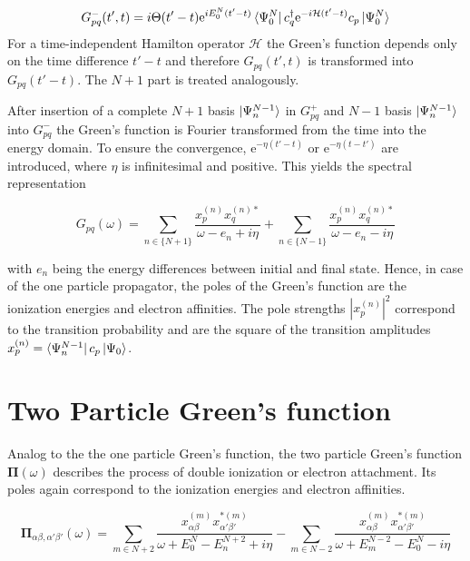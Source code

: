 \begin{equation}\label{g-hsb}
G_{pq}^-(t',t) = i\Theta(t'-t) \mathrm{e}^{iE_0^N(t'-t)}\bra{\Psi_0^N}c_q^\dagger\mathrm{e}^{-i\mathcal{H}(t'-t)}c_p\ket{\Psi_0^N}
\end{equation}
For a time-independent Hamilton operator $\mathcal{H}$ the Green's function
depends only on the time difference $t'-t$ and therefore $G_{pq}(t',t)$ is
transformed into $G_{pq}(t'-t)$. The $N+1$ part is treated analogously.

After insertion of a complete $N+1$ basis $\ket{\Psi_n^{N-1}}$ in
$G_{pq}^+$ and $N-1$ basis $\ket{\Psi_n^{N-1}}$
into $G_{pq}^-$ the Green's function is Fourier transformed from the time
into the energy domain. To ensure the convergence, 
$\mathrm{e}^{-\eta(t'-t)}$ or $\mathrm{e}^{-\eta(t-t')}$ are introduced,
where $\eta$ is infinitesimal and positive.
This yields the spectral representation

\begin{equation}\label{spektraldst}
G_{pq}(\omega) = \sum\limits_{n\in\{N+1\}}\frac{x_p^{(n)}x_q^{(n)*}}{\omega-e_n +i\eta} + \sum\limits_{n\in\{N-1\}}\frac{x_p^{(n)}x_q^{(n)*}}{\omega-e_n -i\eta}
\end{equation}

with $e_n$ being the energy differences between initial and final state. Hence,
in case of the one particle propagator, the poles of the Green's function
are the ionization energies and electron affinities.
The pole strengths $\left|x_p^{(n)}\right|^2$ correspond to the transition
probability and are the square of the transition amplitudes
$x_p^{(n)}=\bra{\Psi_n^{N-1}}c_p\ket{\Psi_0}$.



\section{Two Particle Green's function}
Analog to the the one particle Green's function, the two particle Green's
function $\mathbf{\Pi}(\omega)$ describes the process of double ionization
or electron attachment. Its poles again correspond to the ionization energies
and electron affinities.

\begin{equation}
\mathbf{\Pi}_{\alpha\beta,\alpha'\beta'}(\omega) = \sum\limits_{m\in N+2} \frac{x^{(m)}_{\alpha\beta}x^{*(m)}_{\alpha'\beta'}}{\omega +E_0^N-E_n^{N+2}+i\eta} - \sum\limits_{m\in N-2} \frac{x^{(m)}_{\alpha\beta}x^{*(m)}_{\alpha'\beta'}}{\omega +E_m^{N-2}-E_0^{N}-i\eta}
\end{equation}


